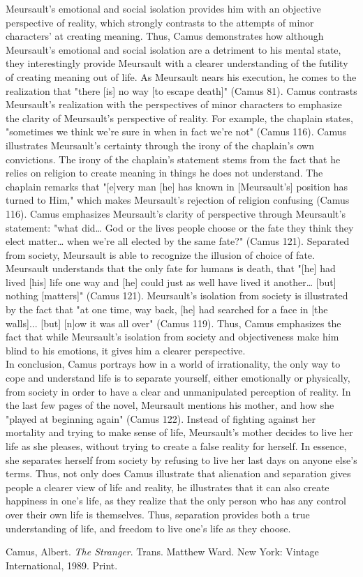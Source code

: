 \documentclass[12pt]{article}
\begin{document}
    Meursault's emotional and social isolation provides him with an
    objective perspective of reality, which strongly contrasts to the
    attempts of minor characters' at creating meaning. Thus, Camus
    demonstrates how although Meursault's emotional and social isolation are
    a detriment to his mental state, they interestingly provide Meursault
    with a clearer understanding of the futility of creating meaning out of
    life. As Meursault nears his execution, he comes to the realization that
    "there [is] no way [to escape death]" (Camus 81). Camus contrasts
    Meursault's realization with the perspectives of minor characters to
    emphasize the clarity of Meursault's perspective of reality. For
    example, the chaplain states, "sometimes we think we're sure in when in
    fact we're not" (Camus 116). Camus illustrates Meursault's certainty
    through the irony of the chaplain's own convictions. The irony of the
    chaplain's statement stems from the fact that he relies on religion to
    create meaning in things he does not understand. The chaplain remarks
    that "[e]very man [he] has known in [Meursault's] position has turned to
    Him," which makes Meursault's rejection of religion confusing (Camus 116). Camus
    emphasizes Meursault's clarity of perspective through Meursault's
    statement: "what did… God or the lives people choose or the fate they
    think they elect matter… when we're all elected by the same fate?"
    (Camus 121). Separated from society, Meursault is able to recognize the
    illusion of choice of fate. Meursault understands that the only fate for
    humans is death, that "[he] had lived [his] life one way and [he] could
    just as well have lived it another… [but] nothing [matters]" (Camus
    121). Meursault's isolation from society is illustrated by the fact that
    "at one time, way back, [he] had searched for a face in [the walls]...
    [but] [n]ow it was all over" (Camus 119). Thus, Camus emphasizes the
    fact that while Meursault's isolation from society and objectiveness
    make him blind to his emotions, it gives him a clearer perspective. \\

    In conclusion, Camus portrays how in a world of irrationality, the only
    way to cope and understand life is to separate yourself, either
    emotionally or physically, from society in order to have a clear and
    unmanipulated perception of reality. In the last few pages of the novel,
    Meursault mentions his mother, and how she "played at beginning again"
    (Camus 122). Instead of fighting against her mortality and trying to
    make sense of life, Meursault's mother decides to live her life as she
    pleases, without trying to create a false reality for herself. In
    essence, she separates herself from society by refusing to live her last
    days on anyone else's terms. Thus, not only does Camus illustrate that
    alienation and separation gives people a clearer view of life and
    reality, he illustrates that it can also create happiness in one's life,
    as they realize that the only person who has any control over their own
    life is themselves. Thus, separation provides both a true understanding
    of life, and freedom to live one's life as they choose.

    \begin{workscited}
        \bibent
        Camus, Albert. \textit{The Stranger}. Trans. Matthew Ward. New York:
            Vintage International, 1989. Print.
    \end{workscited}
\end{document}
